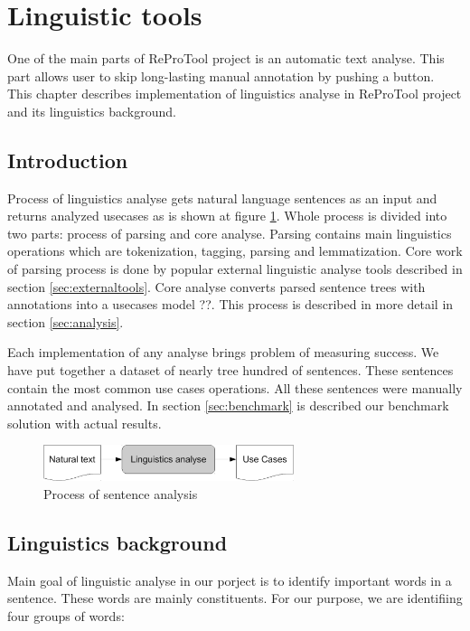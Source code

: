 \section{Linguistic tools}

One of the main parts of ReProTool project is an automatic text analyse. This part allows user to skip long-lasting manual annotation by pushing a button. This chapter describes implementation of linguistics analyse in ReProTool project and its linguistics background.

\subsection{Introduction}
Process of linguistics analyse gets natural language sentences as an input and returns analyzed usecases as is shown at figure \ref{fig:LinguisticsAnalyseSmall}. Whole process is divided into two parts: process of parsing and core analyse. Parsing contains main linguistics operations which are tokenization, tagging, parsing and lemmatization. Core work of parsing process is done by popular external linguistic analyse tools described in section \ref{sec:externaltools}. Core analyse converts parsed sentence trees with annotations into a usecases model ??. This process is described in more detail in section \ref{sec:analysis}. %

Each implementation of any analyse brings problem of measuring success. We have put together a dataset of nearly tree hundred of sentences. These sentences contain the most common use cases operations. All these sentences were manually annotated and analysed. In section \ref{sec:benchmark} is described our benchmark solution with actual results.

\begin{figure}[ht]
  \centering
  \includegraphics[height=30pt]{images/LinguisticsAnalyseSmall}
  \caption{Process of sentence analysis}
  \label{fig:LinguisticsAnalyseSmall}
\end{figure}

\subsection{Linguistics background}

Main goal of linguistic analyse in our porject is to identify important words in a sentence. These words are mainly constituents. For our purpose, we are identifiing four groups of words:

